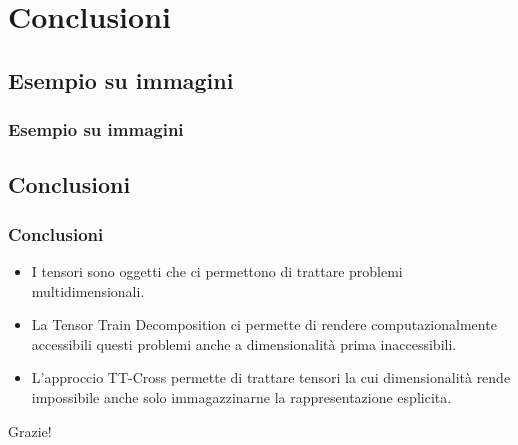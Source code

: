 \documentclass[compress]{beamer}
\theoremstyle{definition}
\theoremstyle{plain}
\begin{document}
\section{Conclusioni}
\subsection{Esempio su immagini}
\begin{frame}
\frametitle{Esempio su immagini}
\begin{center}
\end{center}
\end{frame}

\subsection{Conclusioni}
\begin{frame}
\frametitle{Conclusioni}
\begin{itemize}
	\item I tensori sono oggetti che ci permettono di trattare problemi multidimensionali.
	\item La Tensor Train Decomposition ci permette di rendere computazionalmente accessibili questi problemi anche a dimensionalità prima inaccessibili.
	\item L'approccio TT-Cross permette di trattare tensori la cui dimensionalità rende impossibile anche solo immagazzinarne la rappresentazione esplicita.
\end{itemize}

\pause
\vspace{2mm}
\begin{center}
	\Huge Grazie!
\end{center}
\end{frame}

\end{document}

